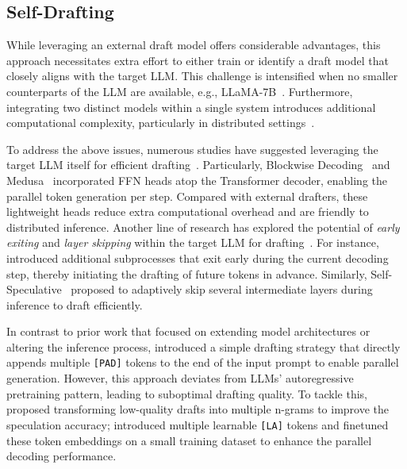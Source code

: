 \subsection{Self-Drafting}
\label{sec:self_drafting}
While leveraging an external draft model offers considerable advantages, this approach necessitates extra effort to either train or identify a draft model that closely aligns with the target LLM. This challenge is intensified when no smaller counterparts of the LLM are available, e.g., LLaMA-7B~\cite{Hugo:2023llama, Hugo:2023llama2}. Furthermore, integrating two distinct models within a single system introduces additional computational complexity, particularly in distributed settings~\cite{medusa}. 

To address the above issues, numerous studies have suggested leveraging the target LLM itself for efficient drafting~\cite{Stern:2018blockwise, Santilli:2023paralleldecoding, Hooper:2023speed, medusa, Fu:2023lookahead, Du:2024glide}. Particularly, Blockwise Decoding~\cite{Stern:2018blockwise} and Medusa~\cite{medusa} incorporated FFN heads atop the Transformer decoder, enabling the parallel token generation per step. Compared with external drafters, these lightweight heads reduce extra computational overhead and are friendly to distributed inference. Another line of research has explored the potential of \textit{early exiting} and \textit{layer skipping} within the target LLM for drafting~\cite{Yang:2023PPD, Zhang:2023draftverify, Hooper:2023speed}. For instance, \citet{Yang:2023PPD} introduced additional subprocesses that exit early during the current decoding step, thereby initiating the drafting of future tokens in advance. Similarly, Self-Speculative~\cite{Zhang:2023draftverify} proposed to adaptively skip several intermediate layers during inference to draft efficiently. 

In contrast to prior work that focused on extending model architectures or altering the inference process, \citet{Santilli:2023paralleldecoding} introduced a simple drafting strategy that directly appends multiple \texttt{[PAD]} tokens to the end of the input prompt to enable parallel generation. However, this approach deviates from LLMs' autoregressive pretraining pattern, leading to suboptimal drafting quality. To tackle this, \citet{Fu:2023lookahead} proposed transforming low-quality drafts into multiple n-grams to improve the speculation accuracy; \citet{Monea:2023PaSS} introduced multiple learnable \texttt{[LA]} tokens and finetuned these token embeddings on a small training dataset to enhance the parallel decoding performance.

